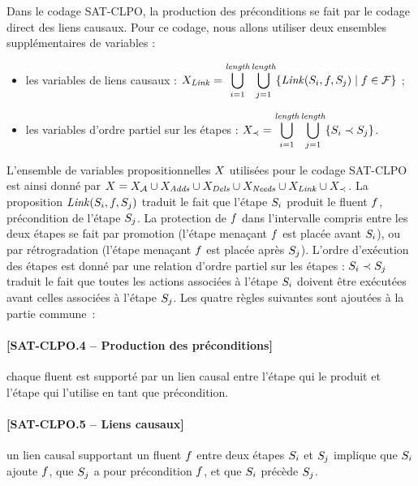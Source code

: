 Dans le codage SAT-CLPO, la production des préconditions se fait par le codage direct des liens causaux.
Pour ce codage, nous allons utiliser deux ensembles supplémentaires de variables :
\begin{itemize}
    \item les variables de liens causaux :
$\displaystyle X_{\mathit{Link}}=\bigcup_{i=1}^{\textit{length}}\bigcup_{j=1}^{\textit{length}}\{\mathit{Link}(S_{i},f,S_{j})\mid f\in\mathcal{F}\}$ ;
    \item les variables d'ordre partiel sur les étapes :
$\displaystyle X_{\prec}=\bigcup_{i=1}^{\textit{length}}\bigcup_{j=1}^{\textit{length}}\{S_{i} \prec S_{j}\}$.
\end{itemize}
L'ensemble de variables propositionnelles $X$ utilisées pour le codage SAT-CLPO est ainsi donné par $X = X_{\mathcal{A}} \cup X_{\mathit{Adds}}\cup X_{\mathit{Dels}}\cup X_{\mathit{Needs}} \cup X_{\mathit{Link}} \cup X_{\prec}$.
La proposition $\mathit{Link}(S_{i},f,S_{j})$ traduit le fait que l'étape $S_{i}$ produit le fluent
$f$, précondition de l'étape $S_{j}$. La protection de $f$ dans l'intervalle compris
entre les deux étapes se fait par promotion (l'étape menaçant $f$ est placée
avant $S_{i}$), ou par rétrogradation (l'étape menaçant $f$ est placée après $S_{j}$).
L'ordre d'exécution des étapes  est donné par une relation d'ordre partiel sur les étapes : $S_{i} \prec S_{j}$ traduit le fait que toutes les actions associées à l'étape $S_{i}$ doivent être exécutées avant celles associées à l'étape $S_{j}$.
Les quatre règles suivantes sont ajoutées à la partie commune~:

\paragraph*{[SAT-CLPO.4 -- Production des préconditions]} chaque fluent est supporté par un lien
  causal entre l'étape qui le produit et l'étape
  qui l'utilise en tant que précondition.
\paragraph*{[SAT-CLPO.5 -- Liens causaux]} un lien causal supportant un fluent $f$ entre
  deux étapes $S_{i}$ et $S_{j}$ implique que $S_{i}$ ajoute $f$, que $S_{j}$ a pour
  précondition $f$, et que $S_{i}$ précède $S_{j}$.
